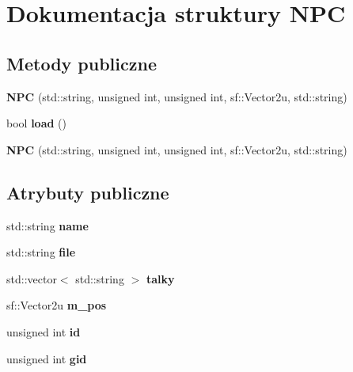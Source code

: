 \hypertarget{struct_n_p_c}{\section{Dokumentacja struktury N\-P\-C}
\label{struct_n_p_c}
}
\subsection*{Metody publiczne}
\begin{DoxyCompactItemize}
\item 
\hypertarget{struct_n_p_c_abf814411b67bede6a6cc1c34c9f29321}{{\bfseries N\-P\-C} (std\-::string, unsigned int, unsigned int, sf\-::\-Vector2u, std\-::string)}\label{struct_n_p_c_abf814411b67bede6a6cc1c34c9f29321}

\item 
\hypertarget{struct_n_p_c_ad403b3bd8aa8cc29aa30b941533ea73a}{bool {\bfseries load} ()}\label{struct_n_p_c_ad403b3bd8aa8cc29aa30b941533ea73a}

\item 
\hypertarget{struct_n_p_c_abf814411b67bede6a6cc1c34c9f29321}{{\bfseries N\-P\-C} (std\-::string, unsigned int, unsigned int, sf\-::\-Vector2u, std\-::string)}\label{struct_n_p_c_abf814411b67bede6a6cc1c34c9f29321}

\end{DoxyCompactItemize}
\subsection*{Atrybuty publiczne}
\begin{DoxyCompactItemize}
\item 
\hypertarget{struct_n_p_c_a275f657bea2e125728a9a9613dd6948f}{std\-::string {\bfseries name}}\label{struct_n_p_c_a275f657bea2e125728a9a9613dd6948f}

\item 
\hypertarget{struct_n_p_c_a2f5b3762132d1955a19441044173b643}{std\-::string {\bfseries file}}\label{struct_n_p_c_a2f5b3762132d1955a19441044173b643}

\item 
\hypertarget{struct_n_p_c_a55f8d51a39bf5e719fbcb187b1bb6907}{std\-::vector$<$ std\-::string $>$ {\bfseries talky}}\label{struct_n_p_c_a55f8d51a39bf5e719fbcb187b1bb6907}

\item 
\hypertarget{struct_n_p_c_a8c9d0b0ba615614d325a0eb0247656fe}{sf\-::\-Vector2u {\bfseries m\-\_\-pos}}\label{struct_n_p_c_a8c9d0b0ba615614d325a0eb0247656fe}

\item 
\hypertarget{struct_n_p_c_a407d030745e6fe60b15f8214d99fd11c}{unsigned int {\bfseries id}}\label{struct_n_p_c_a407d030745e6fe60b15f8214d99fd11c}

\item 
\hypertarget{struct_n_p_c_a89d170cdda416f00ed767ac1d0829199}{unsigned int {\bfseries gid}}\label{struct_n_p_c_a89d170cdda416f00ed767ac1d0829199}

\end{DoxyCompactItemize}


